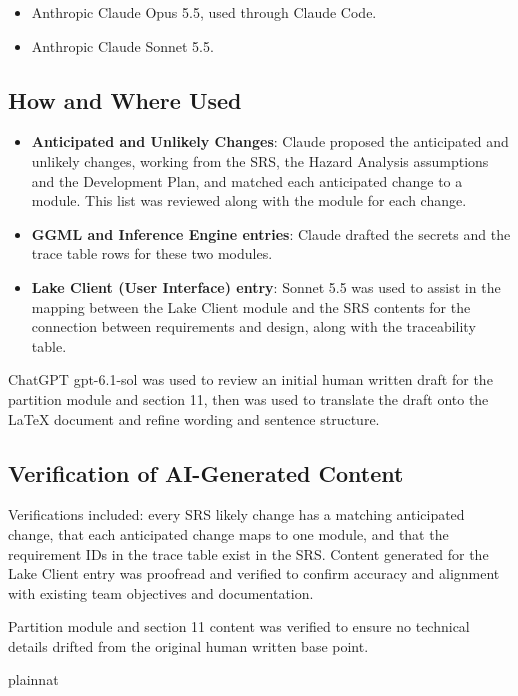 \documentclass[12pt, titlepage]{article}
\begin{document}
\begin{itemize}
    \item Anthropic Claude Opus 5.5, used through Claude Code.
    \item Anthropic Claude Sonnet 5.5.
\end{itemize}

\subsection{How and Where Used}

\begin{itemize}
    \item \textbf{Anticipated and Unlikely Changes}: Claude proposed the
    anticipated and unlikely changes, working from the SRS, the Hazard Analysis
    assumptions and the Development Plan, and matched each anticipated change
    to a module. This list was reviewed along with the module for each change.
    \item \textbf{GGML and Inference Engine entries}: Claude drafted the
    secrets and the trace table rows for these two modules.
    \item \textbf{Lake Client (User Interface) entry}: Sonnet 5.5 was used to
    assist in the mapping between the Lake Client module and the SRS contents
    for the connection between requirements and design, along with the
    traceability table.
\end{itemize}

ChatGPT gpt-6.1-sol was used to review an initial human written draft for the partition 
module and section 11, then was used to translate the draft onto the LaTeX document and 
refine wording and sentence structure.

\subsection{Verification of AI-Generated Content}

Verifications included: every SRS likely change has a matching anticipated change, that
each anticipated change maps to one module, and that the requirement IDs in the
trace table exist in the SRS. Content generated for the Lake Client entry was
proofread and verified to confirm accuracy and alignment with existing team
objectives and documentation.

Partition module and section 11 content was verified to ensure no technical details 
drifted from the original human written base point.
\newpage{}

 {plainnat}

\end{document}
